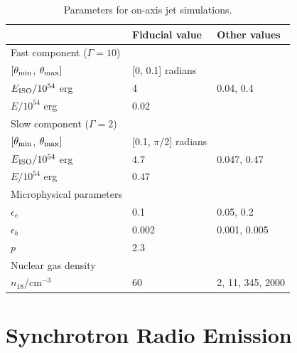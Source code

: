 \documentclass[usenatbib,fleqn]{mnras}
\begin{document}
\begin{table}
\begin{threeparttable}
  \caption{\label{tab:jetParams} Parameters for on-axis jet simulations.}
  \begin{tabular*}{0.95\columnwidth}{lll}
\hline
& Fiducial value & Other values \\
\hline\hline
    Fast component ($\Gamma=10$) &  &  \\ 
    \hline
    $[\theta_{\rm min}$, $\theta_{\rm max}]$ & [0, 0.1] radians & \\
    $E_{\rm ISO}/10^{54}$ erg & 4  & 0.04, 0.4\\
    $E/10^{54}$ erg & 0.02 & \\
    \hline 
    Slow component ($\Gamma=2$)\\
\hline
    $[\theta_{\rm min}$, $\theta_{\rm max}]$ & [0.1, $\pi/2$] radians
    & \\
    $E_{\rm ISO}/10^{54}$ erg & $4.7$ & 0.047, 0.47 \\
    $E/10^{54}$  erg & $0.47$ & \\
    \hline
    Microphysical parameters\\
\hline
    $\epsilon_e$ & 0.1 &  0.05, 0.2\\
    $\epsilon_b$ & 0.002 & 0.001, 0.005\\
    $p$ & 2.3\\
    \hline 
    Nuclear gas density \\
\hline
    $n_{18}$/cm$^{-3}$ & 60 & 2, 11, 345, 2000
  \end{tabular*}
\end{threeparttable}
\end{table}


\section{Synchrotron Radio Emission}

\label{sec:results}
\end{document}
